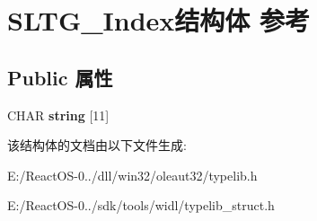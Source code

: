 \hypertarget{struct_s_l_t_g___index}{}\section{S\+L\+T\+G\+\_\+\+Index结构体 参考}
\label{struct_s_l_t_g___index}
\subsection*{Public 属性}
\begin{DoxyCompactItemize}
\item 
\mbox{\label{struct_s_l_t_g___index_a6e37d6e7cb720437ec4bea68023d9f7f}} 
C\+H\+AR {\bfseries string} \mbox{[}11\mbox{]}
\end{DoxyCompactItemize}


该结构体的文档由以下文件生成\+:\begin{DoxyCompactItemize}
\item 
E\+:/\+React\+O\+S-\/0../dll/win32/oleaut32/typelib.\+h\item 
E\+:/\+React\+O\+S-\/0../sdk/tools/widl/typelib\+\_\+struct.\+h\end{DoxyCompactItemize}
